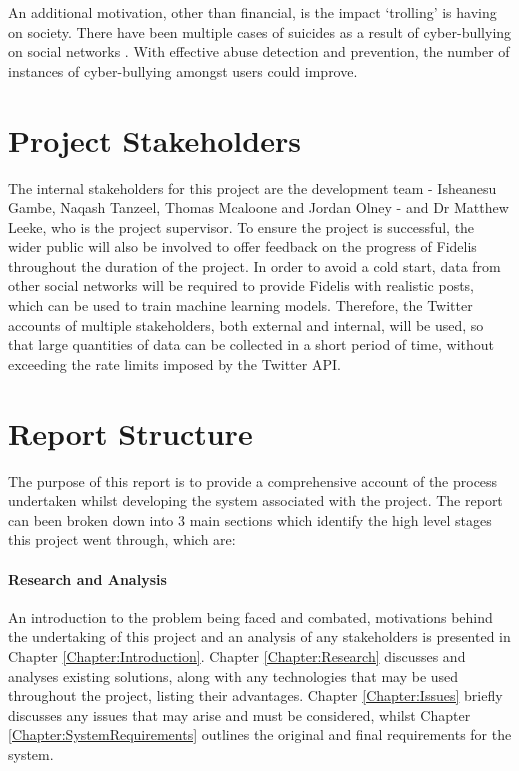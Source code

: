 An additional motivation, other than financial, is the impact `trolling' is having on society. There have been multiple cases of suicides as a result of cyber-bullying on social networks \cite{NoBullying:Cyber}. With effective abuse detection and prevention, the number of instances of cyber-bullying amongst users could improve.

\section{Project Stakeholders}
The internal stakeholders for this project are the development team - Isheanesu Gambe, Naqash Tanzeel, Thomas Mcaloone and Jordan Olney - and Dr Matthew Leeke, who is the project supervisor. To ensure the project is successful, the wider public will also be involved to offer feedback on the progress of Fidelis throughout the duration of the project. In order to avoid a cold start, data from other social networks will be required to provide Fidelis with realistic posts, which can be used to train machine learning models. Therefore, the Twitter accounts of multiple stakeholders, both external and internal, will be used, so that large quantities of data can be collected in a short period of time, without exceeding the rate limits imposed by the Twitter API.

\section{Report Structure}
The purpose of this report is to provide a comprehensive account of the process undertaken whilst developing the system associated with the project. The report can been broken down into 3 main sections which identify the high level stages this project went through, which are:

\paragraph{Research and Analysis}
An introduction to the problem being faced and combated, motivations behind the undertaking of this project and an analysis of any stakeholders is presented in Chapter \ref{Chapter:Introduction}. Chapter \ref{Chapter:Research} discusses and analyses existing solutions, along with any technologies that may be used throughout the project, listing their advantages. Chapter \ref{Chapter:Issues} briefly discusses any issues that may arise and must be considered, whilst Chapter \ref{Chapter:SystemRequirements} outlines the original and final requirements for the system.

